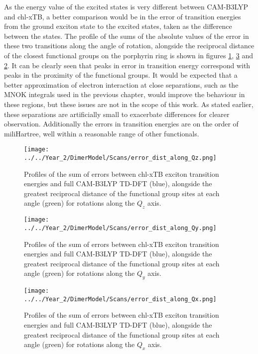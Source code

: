 As the energy value of the excited states is very different between CAM-B3LYP and
chl-xTB, a better comparison would be in the error of transition energies from the
ground exciton state to the excited states, taken as the difference between the 
states. The profile of the sums of the absolute values of the error in these two
transitions along the angle of rotation, alongside the reciprocal distance of the
closest functional groups on the porphyrin ring is shown in figures \ref{fig:error_along_qz}, 
\ref{fig:error_along_qx} and \ref{fig:error_along_qy}. It can be clearly seen that
peaks in error in transition energy correspond with peaks in the proximity of the
functional groups. It would be expected that a better approximation of electron 
interaction at close separations, such as the MNOK integrals used in the previous
chapter, would improve the behaviour in these regions, but these issues are not 
in the scope of this work. As stated earlier, these separations are artificially 
small to exacerbate differences for clearer observation. Additionally the errors 
in transition energies are on the order of miliHartree, well within a reasonable
range of other functionals.

\begin{figure}
    \centering
    \texttt{[image: ../../Year\_2/DimerModel/Scans/error\_dist\_along\_Qz.png]}
    \caption{Profiles of the sum of errors between chl-xTB exciton transition energies
    and full CAM-B3LYP TD-DFT (blue), alongside the greatest reciprocal distance
    of the functional group sites at each angle (green) for rotations along the
    $Q_z$ axis.}
    \label{fig:error_along_qz}
\end{figure}

\begin{figure}
    \centering
    \texttt{[image: ../../Year\_2/DimerModel/Scans/error\_dist\_along\_Qy.png]}
    \caption{Profiles of the sum of errors between chl-xTB exciton transition energies
    and full CAM-B3LYP TD-DFT (blue), alongside the greatest reciprocal distance
    of the functional group sites at each angle (green) for rotations along the
    $Q_y$ axis.}
    \label{fig:error_along_qy}
\end{figure}

\begin{figure}
    \centering
    \texttt{[image: ../../Year\_2/DimerModel/Scans/error\_dist\_along\_Qx.png]}
    \caption{Profiles of the sum of errors between chl-xTB exciton transition energies
    and full CAM-B3LYP TD-DFT (blue), alongside the greatest reciprocal distance
    of the functional group sites at each angle (green) for rotations along the
    $Q_x$ axis.}
    \label{fig:error_along_qx}
\end{figure}


